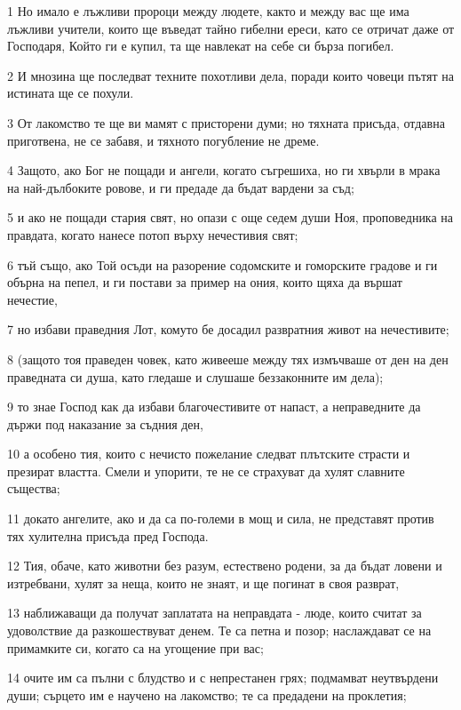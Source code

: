 \par 1 Но имало е лъжливи пророци между людете, както и между вас ще има лъжливи учители, които ще въведат тайно гибелни ереси, като се отричат даже от Господаря, Който ги е купил, та ще навлекат на себе си бърза погибел.
\par 2 И мнозина ще последват техните похотливи дела, поради които човеци пътят на истината ще се похули.
\par 3 От лакомство те ще ви мамят с присторени думи; но тяхната присъда, отдавна приготвена, не се забавя, и тяхното погубление не дреме.
\par 4 Защото, ако Бог не пощади и ангели, когато съгрешиха, но ги хвърли в мрака на най-дълбоките ровове, и ги предаде да бъдат вардени за съд;
\par 5 и ако не пощади стария свят, но опази с още седем души Ноя, проповедника на правдата, когато нанесе потоп върху нечестивия свят;
\par 6 тъй също, ако Той осъди на разорение содомските и гоморските градове и ги обърна на пепел, и ги постави за пример на ония, които щяха да вършат нечестие,
\par 7 но избави праведния Лот, комуто бе досадил развратния живот на нечестивите;
\par 8 (защото тоя праведен човек, като живееше между тях измъчваше от ден на ден праведната си душа, като гледаше и слушаше беззаконните им дела);
\par 9 то знае Господ как да избави благочестивите от напаст, а неправедните да държи под наказание за съдния ден,
\par 10 а особено тия, които с нечисто пожелание следват плътските страсти и презират властта. Смели и упорити, те не се страхуват да хулят славните същества;
\par 11 докато ангелите, ако и да са по-големи в мощ и сила, не представят против тях хулителна присъда пред Господа.
\par 12 Тия, обаче, като животни без разум, естествено родени, за да бъдат ловени и изтребвани, хулят за неща, които не знаят, и ще погинат в своя разврат,
\par 13 наближаващи да получат заплатата на неправдата - люде, които считат за удоволствие да разкошествуват денем. Те са петна и позор; наслаждават се на примамките си, когато са на угощение при вас;
\par 14 очите им са пълни с блудство и с непрестанен грях; подмамват неутвърдени души; сърцето им е научено на лакомство; те са предадени на проклетия;
